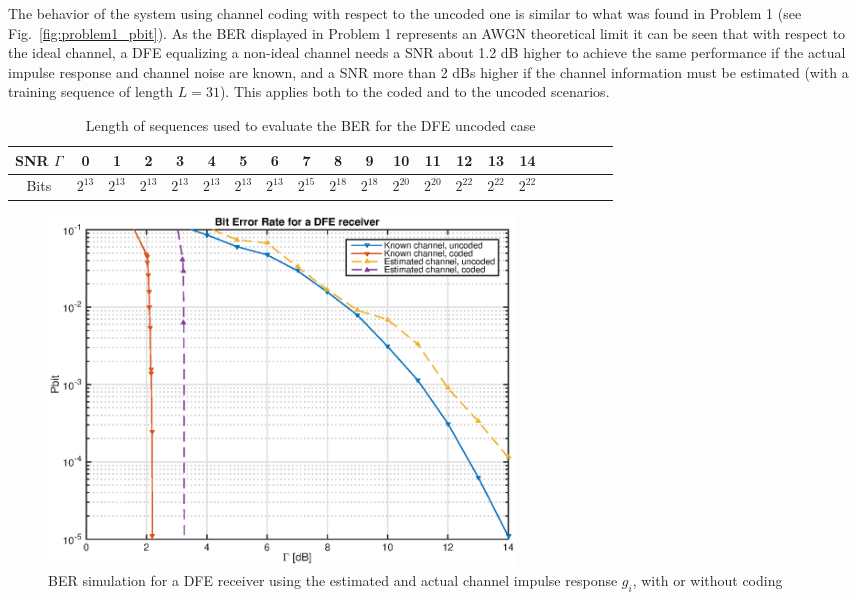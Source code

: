 \documentclass[10pt]{article}
\begin{document}
The behavior of the system using channel coding with respect to the uncoded one is similar to what was found in Problem 1 (see Fig.~\ref{fig:problem1_pbit}). As the BER displayed in Problem 1 represents an AWGN theoretical limit it can be seen that with respect to the ideal channel, a DFE equalizing a non-ideal channel needs a SNR about 1.2 dB higher to achieve the same performance if the actual impulse response and channel noise are known, and a SNR more than 2 dBs higher if the channel information must be estimated (with a training sequence of length $L=31$). This applies both to the coded and to the uncoded scenarios. %
\begin{table}[h!]
	\begin{tabular}{c|c|c|c|c|c|c|c|c|c|c|c|c|c|c|c|c|c|c|c|c}
		SNR $\Gamma$	& 0 & 1 & 2 & 3 & 4 &	5	&	6	&	7	&	8	&	9	&	10	&	11	&	12	&	13	&	14	\\ \hline	
		Bits	& $2^{13}$ & $2^{13}$ & $2^{13}$ & $2^{13}$ & $2^{13}$ & $2^{13}$ & $2^{13}$ & $2^{15}$ & $2^{18}$ & $2^{18}$ & $2^{20}$ & $2^{20}$ & $2^{22}$ & $2^{22}$ & $2^{22}$ \\
	\end{tabular}
	\caption{Length of sequences used to evaluate the BER for the DFE uncoded case}
	\label{table:BER_len_DFE}
\end{table}


\begin{figure}[H]
	\centering
	\includegraphics[width = 0.6\textwidth]{problem2}
	\caption{BER simulation for a DFE receiver using the estimated and actual channel impulse response $g_i$, with or without coding}
	\label{fig:problem2_pbit}
\end{figure}
\end{document}
